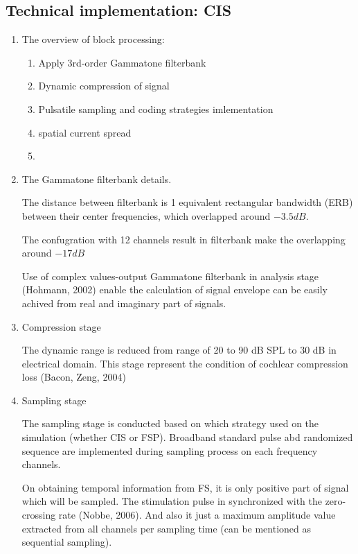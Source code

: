 \subsection{Technical implementation: CIS}
\begin{enumerate}
	\item The overview of block processing:
	\begin{enumerate}
		\item Apply 3rd-order Gammatone filterbank 
		\item Dynamic compression of signal 
		\item Pulsatile sampling and coding strategies imlementation
		\item spatial current spread
		\item 
	\end{enumerate}
	
	\item The Gammatone filterbank details.
	
	The distance between filterbank is 1 equivalent rectangular bandwidth (ERB) between their center frequencies, which overlapped around \(-3.5 dB\). 
	
	The confugration with 12 channels result in filterbank make the overlapping around \(-17 dB\)
	
	Use of complex values-output Gammatone filterbank in analysis stage (Hohmann, 2002) enable the calculation of signal envelope can be easily achived from real and imaginary part of signals.
	
	\item Compression stage
	
	The dynamic range is reduced from range of 20 to 90 dB SPL to 30 dB in electrical domain. This stage represent the condition of cochlear compression loss (Bacon, Zeng, 2004)
	
	\item Sampling stage
	
	The sampling stage is conducted based on which strategy used on the simulation (whether CIS or FSP). Broadband standard pulse abd randomized sequence are implemented during sampling process on each frequency channels. 
	
	On obtaining temporal information from FS, it is only positive part of signal which will be sampled. The stimulation pulse in synchronized with the zero-crossing rate (Nobbe, 2006). And also it just a maximum amplitude value extracted from all channels per sampling time (can be mentioned as sequential sampling).
	

\end{enumerate}
